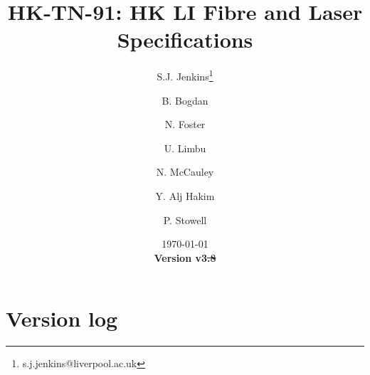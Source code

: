 \documentclass[a4paper,11pt]{article}
\providecommand{\DIFaddtex}[1]{{\protect\color{blue}\uwave{#1}}} %
\providecommand{\DIFdeltex}[1]{{\protect\color{red}\sout{#1}}}                      %
\providecommand{\DIFaddbegin}{} %
\providecommand{\DIFaddend}{} %
\providecommand{\DIFdelbegin}{} %
\providecommand{\DIFdelend}{} %
\providecommand{\DIFadd}[1]{\texorpdfstring{\DIFaddtex{#1}}{#1}} %
\providecommand{\DIFdel}[1]{\texorpdfstring{\DIFdeltex{#1}}{}} %
\newcommand{\DIFscaledelfig}{0.5}
\newlength{\DIFdelgraphicswidth} %
\newlength{\DIFdelgraphicsheight} %
\newcommand{\DIFaddincludegraphics}[2][]{{\color{blue}\fbox{\DIFOincludegraphics[#1]{#2}}}} %
\newcommand{\DIFdelincludegraphics}[2][]{%
\sbox{\DIFdelgraphicsbox}{\DIFOincludegraphics[#1]{#2}}%
\settoboxwidth{\DIFdelgraphicswidth}{\DIFdelgraphicsbox} %
\settoboxtotalheight{\DIFdelgraphicsheight}{\DIFdelgraphicsbox} %
\scalebox{\DIFscaledelfig}{%
\parbox[b]{\DIFdelgraphicswidth}{\usebox{\DIFdelgraphicsbox}\\[-\baselineskip] \rule{\DIFdelgraphicswidth}{0em}}\llap{\resizebox{\DIFdelgraphicswidth}{\DIFdelgraphicsheight}{%
\setlength{\unitlength}{\DIFdelgraphicswidth}%
\begin{picture}(1,1)%
\thicklines\linethickness{2pt} %
{\color[rgb]{1,0,0}\put(0,0){\framebox(1,1){}}}%
{\color[rgb]{1,0,0}\put(0,0){\line( 1,1){1}}}%
{\color[rgb]{1,0,0}\put(0,1){\line(1,-1){1}}}%
\end{picture}%
}\hspace*{3pt}}} %
} %
\DeclareRobustCommand{\DIFaddbegin}{\DIFOaddbegin \let\includegraphics\DIFaddincludegraphics} %
\DeclareRobustCommand{\DIFaddend}{\DIFOaddend \let\includegraphics\DIFOincludegraphics} %
\DeclareRobustCommand{\DIFdelbegin}{\DIFOdelbegin \let\includegraphics\DIFdelincludegraphics} %
\DeclareRobustCommand{\DIFdelend}{\DIFOaddend \let\includegraphics\DIFOincludegraphics} %
\begin{document}
\title{\huge{HK-TN-91: HK LI Fibre and Laser Specifications}}
\author[1]{S.J. Jenkins\footnote{s.j.jenkins@liverpool.ac.uk}}
\author[1]{B. Bogdan}
\author[1]{N. Foster}
\author[1]{U. Limbu}
\author[1]{N. McCauley}
\author[2]{Y. Alj Hakim}
\author[2]{P. Stowell}
\date{\today\\
{\bf Version v3\DIFdelbegin \DIFdel{.8}\DIFdelend \DIFaddbegin \DIFadd{.10}\DIFaddend }}

\maketitle

\tableofcontents

\newpage

\section{Version log}
\end{document}
